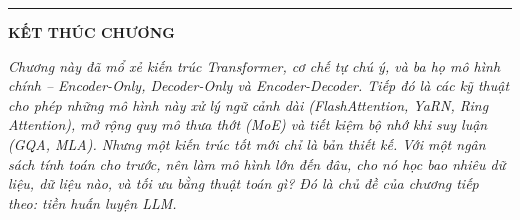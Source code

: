 \bigskip
\hrule
\bigskip

\begin{center}
    \textbf{\Large KẾT THÚC CHƯƠNG \thechapter}
\end{center}

\textit{Chương này đã mổ xẻ kiến trúc Transformer, cơ chế tự chú ý, và ba họ mô hình chính -- Encoder-Only, Decoder-Only và Encoder-Decoder. Tiếp đó là các kỹ thuật cho phép những mô hình này xử lý ngữ cảnh dài (FlashAttention, YaRN, Ring Attention), mở rộng quy mô thưa thớt (MoE) và tiết kiệm bộ nhớ khi suy luận (GQA, MLA). Nhưng một kiến trúc tốt mới chỉ là bản thiết kế. Với một ngân sách tính toán cho trước, nên làm mô hình lớn đến đâu, cho nó học bao nhiêu dữ liệu, dữ liệu nào, và tối ưu bằng thuật toán gì? Đó là chủ đề của chương tiếp theo: tiền huấn luyện LLM.}
